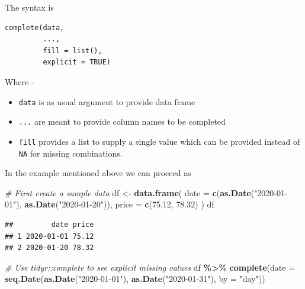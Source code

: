 \documentclass[
]{book}
\newenvironment{Shaded}{\begin{snugshade}}{\end{snugshade}}
\newcommand{\AttributeTok}[1]{\textcolor[rgb]{0.13,0.29,0.53}{#1}}
\newcommand{\CommentTok}[1]{\textcolor[rgb]{0.56,0.35,0.01}{\textit{#1}}}
\newcommand{\FloatTok}[1]{\textcolor[rgb]{0.00,0.00,0.81}{#1}}
\newcommand{\FunctionTok}[1]{\textcolor[rgb]{0.13,0.29,0.53}{\textbf{#1}}}
\newcommand{\NormalTok}[1]{#1}
\newcommand{\OtherTok}[1]{\textcolor[rgb]{0.56,0.35,0.01}{#1}}
\newcommand{\SpecialCharTok}[1]{\textcolor[rgb]{0.81,0.36,0.00}{\textbf{#1}}}
\newcommand{\StringTok}[1]{\textcolor[rgb]{0.31,0.60,0.02}{#1}}
\providecommand{\tightlist}{%
  \setlength{\itemsep}{0pt}\setlength{\parskip}{0pt}}
\begin{document}
The syntax is

\begin{verbatim}
complete(data, 
         ..., 
         fill = list(), 
         explicit = TRUE)
\end{verbatim}

Where -

\begin{itemize}
\tightlist
\item
  \texttt{data} is as usual argument to provide data frame
\item
  \texttt{...} are meant to provide column names to be completed
\item
  \texttt{fill} provides a list to supply a single value which can be provided instead of \texttt{NA} for missing combinations.
\end{itemize}

In the example mentioned above we can proceed as

\begin{Shaded}
\begin{Highlighting}[]
\CommentTok{\# First create a sample data}
\NormalTok{df }\OtherTok{\textless{}{-}} \FunctionTok{data.frame}\NormalTok{(}
  \AttributeTok{date =} \FunctionTok{c}\NormalTok{(}\FunctionTok{as.Date}\NormalTok{(}\StringTok{"2020{-}01{-}01"}\NormalTok{), }\FunctionTok{as.Date}\NormalTok{(}\StringTok{"2020{-}01{-}20"}\NormalTok{)),}
  \AttributeTok{price =} \FunctionTok{c}\NormalTok{(}\FloatTok{75.12}\NormalTok{, }\FloatTok{78.32}\NormalTok{)}
\NormalTok{)}
\NormalTok{df }
\end{Highlighting}
\end{Shaded}

\begin{verbatim}
##         date price
## 1 2020-01-01 75.12
## 2 2020-01-20 78.32
\end{verbatim}

\begin{Shaded}
\begin{Highlighting}[]
\CommentTok{\# Use tidyr::complete to see explicit missing values}
\NormalTok{df }\SpecialCharTok{\%\textgreater{}\%} 
  \FunctionTok{complete}\NormalTok{(}\AttributeTok{date =} \FunctionTok{seq.Date}\NormalTok{(}\FunctionTok{as.Date}\NormalTok{(}\StringTok{"2020{-}01{-}01"}\NormalTok{), }\FunctionTok{as.Date}\NormalTok{(}\StringTok{"2020{-}01{-}31"}\NormalTok{), }\AttributeTok{by =} \StringTok{"day"}\NormalTok{))}
\end{Highlighting}
\end{Shaded}
\end{document}
